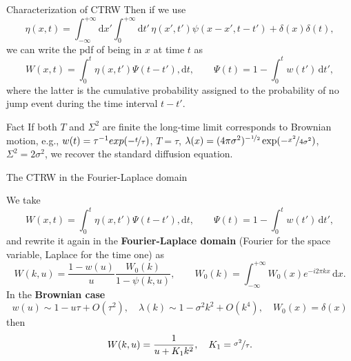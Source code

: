 \documentclass[aspectratio=169,xcolor=dvipsnames]{beamer}
\begin{document}
\begin{frame}{Characterization of CTRW}
Then if we use 
\[
\eta(x,t) = \int_{-\infty}^{+\infty} \textrm{d}x' \int_{0}^{+\infty} \textrm{d}t'\,\eta(x',t') \psi(x-x',t-t') + \delta(x)\delta(t),
\]
we can write the pdf of being in $x$ at time $t$ as
\[
W(x,t) = \int_{0}^{t} \eta(x,t') \Psi(t-t'),\textrm{d}t, \qquad \Psi(t) = 1 - \int_{0}^{t} w(t')\,\textrm{d}t',
\]
where the latter is the cumulative probability assigned to the probability of \alert{no jump event} during the time interval  $t-t'$.
\begin{alertblock}{Fact}
If both $T$ and $\Sigma^2$ are finite the long-time limit corresponds to Brownian motion, e.g., $w(t) = \tau^{-1} exp(-\nicefrac{t}{\tau})$, $T = \tau$, $\lambda(x) = (4\pi \sigma^2)^{-\nicefrac{1}{2}} \exp(-\nicefrac{x^2}{4\sigma^2})$, $\Sigma^2 = 2 \sigma^2$, we recover the standard diffusion equation.
\end{alertblock}
\end{frame}

\begin{frame}{The CTRW in the Fourier-Laplace domain}

We take
\[
W(x,t) = \int_{0}^{t} \eta(x,t') \Psi(t-t'),\textrm{d}t, \qquad \Psi(t) = 1 - \int_{0}^{t} w(t')\,\textrm{d}t',
\]
and rewrite it again in the \textbf{Fourier-Laplace domain} (Fourier for the space variable, Laplace for the time one) as
\[
W(k,u) = \frac{1-w(u)}{u} \frac{W_0(k)}{1-\psi(k,u)}, \qquad W_0(k) = \int_{-\infty}^{+\infty} W_0(x) e^{-i 2 \pi k x}\,\textrm{d}x.
\]
In the \textbf{Brownian case}
\[
w(u) \sim 1 - u\tau + O(\tau^2), \quad \lambda(k) \sim 1 - \sigma^2 k^2 + O(k^4), \quad W_0(x) = \delta(x)
\]
then
\[
W(k,u) = \frac{1}{u + K_1 k^2}, \quad K_1 = \nicefrac{\sigma^2}{\tau}.
\]

\end{frame}
\end{document}

